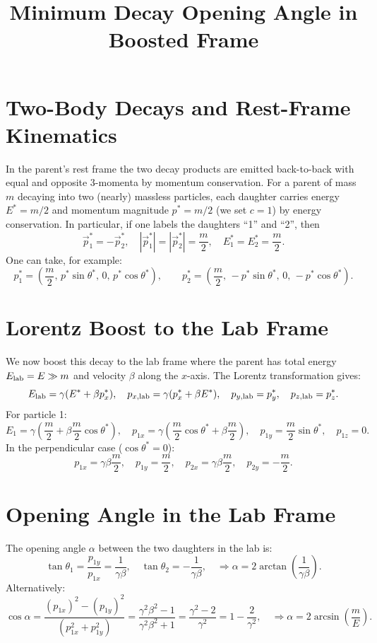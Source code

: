 \documentclass[12pt]{article}
\title{Minimum Decay Opening Angle in Boosted Frame}
\author{}
\date{}
\begin{document}
\maketitle

\section*{Two-Body Decays and Rest-Frame Kinematics}

In the parent’s rest frame the two decay products are emitted back-to-back with equal and opposite 3-momenta by momentum conservation. For a parent of mass $m$ decaying into two (nearly) massless particles, each daughter carries energy $E^* = m/2$ and momentum magnitude $p^* = m/2$ (we set $c=1$) by energy conservation. In particular, if one labels the daughters “1” and “2”, then
\[
\vec{p}_1^* = -\vec{p}_2^*,\quad |\vec{p}_1^*| = |\vec{p}_2^*| = \frac{m}{2},\quad E_1^* = E_2^* = \frac{m}{2}.
\]
One can take, for example:
\[
p_1^* = \left(\frac{m}{2},\, p^* \sin\theta^*,\, 0,\, p^* \cos\theta^*\right),\qquad
p_2^* = \left(\frac{m}{2},\, -p^* \sin\theta^*,\, 0,\, -p^* \cos\theta^*\right).
\]

\section*{Lorentz Boost to the Lab Frame}

We now boost this decay to the lab frame where the parent has total energy $E_{\rm lab} = E \gg m$ and velocity $\beta$ along the $x$-axis. The Lorentz transformation gives:
\[
E_{\rm lab} = \gamma(E^* + \beta p^*_x), \quad
p_{x,{\rm lab}} = \gamma(p^*_x + \beta E^*), \quad
p_{y,{\rm lab}} = p^*_y, \quad p_{z,{\rm lab}} = p^*_z.
\]
For particle 1:
\[
E_1 = \gamma\left(\frac{m}{2} + \beta \frac{m}{2} \cos\theta^* \right),\quad
p_{1x} = \gamma\left(\frac{m}{2} \cos\theta^* + \beta \frac{m}{2} \right),\quad
p_{1y} = \frac{m}{2} \sin\theta^*,\quad
p_{1z} = 0.
\]
In the perpendicular case ($\cos\theta^* = 0$):
\[
p_{1x} = \gamma\beta \frac{m}{2},\quad p_{1y} = \frac{m}{2}, \quad
p_{2x} = \gamma\beta \frac{m}{2},\quad p_{2y} = -\frac{m}{2}.
\]

\section*{Opening Angle in the Lab Frame}

The opening angle $\alpha$ between the two daughters in the lab is:
\[
\tan\theta_1 = \frac{p_{1y}}{p_{1x}} = \frac{1}{\gamma\beta}, \quad
\tan\theta_2 = -\frac{1}{\gamma\beta}, \quad
\Rightarrow \alpha = 2 \arctan\left(\frac{1}{\gamma\beta}\right).
\]
Alternatively:
\[
\cos\alpha = \frac{(p_{1x})^2 - (p_{1y})^2}{(p_{1x}^2 + p_{1y}^2)}
= \frac{\gamma^2\beta^2 - 1}{\gamma^2\beta^2 + 1}
= \frac{\gamma^2 - 2}{\gamma^2}
= 1 - \frac{2}{\gamma^2},
\quad \Rightarrow \alpha = 2 \arcsin\left(\frac{m}{E}\right).
\]
\end{document}
